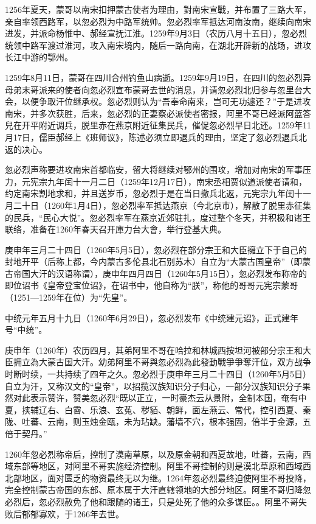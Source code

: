 1256年夏天，蒙哥以南宋扣押蒙古使者为理由，對南宋宣戰，并布置了三路大军，亲自率领西路军，以忽必烈为中路军统帅。忽必烈率军抵达河南汝南，继续向南宋进发，并派命杨惟中、郝经宣抚江淮。1259年9月3日（农历八月十五日），忽必烈统领中路军渡过淮河，攻入南宋境内，随后一路向南，在湖北开辟新的战场，进攻长江中游的鄂州。

1259年8月11日，蒙哥在四川合州钓鱼山病逝。1259年9月19日，在四川的忽必烈异母弟末哥派来的使者向忽必烈宣布蒙哥去世的消息，并请忽必烈北归参与忽里台大会，以便争取汗位继承权。忽必烈则认为“吾奉命南来，岂可无功遽还？”于是进攻南宋，并多次获胜，后来，忽必烈的正妻察必派使者密报，阿里不哥已经派阿蓝答兒在开平附近调兵，脱里赤在燕京附近征集民兵，催促忽必烈早日北还。1259年11月17日，儒臣郝经上《班师议》，陈述必须立即退兵的理由，坚定了忽必烈退兵北返的决心。

忽必烈声称要进攻南宋首都临安，留大将继续对鄂州的围攻，增加对南宋的军事压力，元宪宗九年闰十一月二日（1259年12月17日），南宋丞相贾似道派使者请和，约定南宋割地求和，并且送岁币，忽必烈于是在当日撤兵北返，元宪宗九年闰十一月二十日（1260年1月4日），忽必烈率军抵达燕京（今北京市），解散了脱里赤征集的民兵，“民心大悦”。忽必烈率军在燕京近郊驻扎，度过整个冬天，并积极和诸王联络，准备在1260年春天召开庫力台大會，举行登基大典。

庚申年三月二十四日（1260年5月5日），忽必烈在部分宗王和大臣擁立下于自己的封地开平（后称上都，今内蒙古多伦县北石别苏木）自立为“大蒙古国皇帝”（即蒙古帝国大汗的汉语称谓），庚申年四月四日（1260年5月15日），忽必烈发布称帝的即位诏书《皇帝登宝位诏》，在诏书中，他自称为“朕”，称他的哥哥元宪宗蒙哥（1251—1259年在位）为“先皇”。

中统元年五月十九日（1260年6月29日），忽必烈发布《中统建元诏》，正式建年号“中统”。

庚申年（1260年）农历四月，其弟阿里不哥在哈拉和林城西按坦河被部分宗王和大臣拥立為大蒙古国大汗。幼弟阿里不哥與忽必烈為此發動戰爭爭奪汗位，双方战争时断时续，一共持续了四年之久。忽必烈于庚申年三月二十四日（1260年5月5日）自立为汗，又称汉文的“皇帝”，以招揽汉族知识分子归心，一部分汉族知识分子果然对此表示赞许，赞美忽必烈“既以正立，一时豪杰云从景附，全制本国，奄有中夏，挟辅辽右、白霫、乐浪、玄菟、秽貊、朝鲜，面左燕云、常代，控引西夏、秦陇、吐蕃、云南，则玉烛金瓯，未为玷缺。藩墙不穴，根本强固，倍半于金源，五倍于契丹。”

1260年忽必烈称帝后，控制了漠南草原，以及原金朝和西夏故地，吐蕃，云南，西域东部等地区，对阿里不哥实施经济控制。阿里不哥控制的则是漠北草原和西域西北部地区，面对匮乏的物资最终无以为继。1264年忽必烈最终迫使阿里不哥投降，完全控制蒙古帝国的东部、原本属于大汗直辖领地的大部分地区。阿里不哥归降忽必烈后，忽必烈赦免了他和跟随的诸王，只是处死了他的众多谋臣。。阿里不哥失败后郁郁寡欢，于1266年去世。

